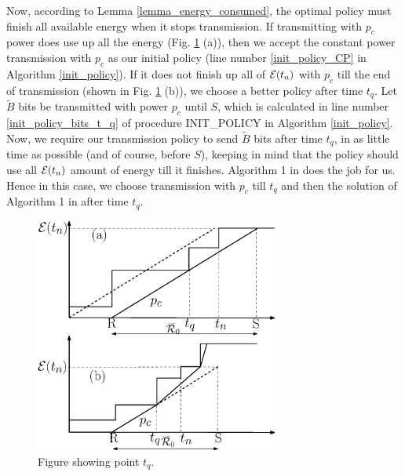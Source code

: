 Now, according to Lemma \ref{lemma_energy_consumed}, the optimal policy must finish all available energy when it stops transmission. If transmitting with $p_c$ power does use up all the energy (Fig. \ref{straight} (a)), then we accept the constant power transmission with $p_c$ as our initial policy (line number \ref{init_policy_CP} in Algorithm \ref{init_policy}). If it does not finish up all of $\mathcal{E}(t_n)$ with $p_c$ till the end of transmission (shown in Fig. \ref{straight} (b)), we choose a better policy after time $t_q$. Let $\widetilde{B}$ bits be transmitted with power $p_c$ until $S$, which is calculated in line number \ref{init_policy_bits_t_q} of procedure INIT\_POLICY in Algorithm \ref{init_policy}. Now, we require our transmission policy to send $\widetilde{B}$ bits after time $t_q$, in as little time as possible (and of course, before $S$), keeping in mind that the policy should use all $\mathcal{E}(t_n)$ amount of energy till it finishes. Algorithm 1 in \cite{Yang} does the job for us. Hence in this case, we choose transmission with $p_c$ till $t_q$ and then the solution of Algorithm 1 in \cite{Yang} after time $t_q$. 

\begin{figure}
\centering
  \centerline{\includegraphics[width=8cm]{straight.eps}}
\caption{Figure showing point $t_q$.}\label{straight}
\end{figure}

